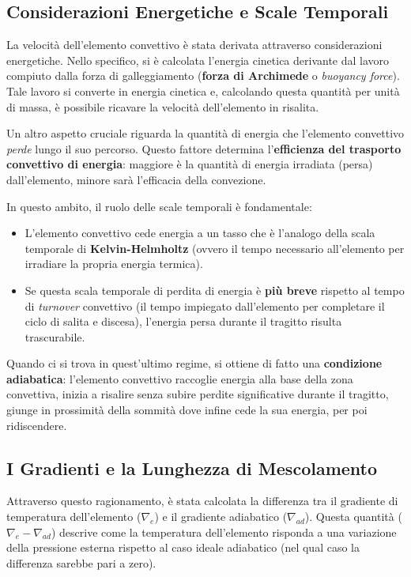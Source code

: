 \subsection{Considerazioni Energetiche e Scale Temporali}

La velocità dell'elemento convettivo è stata derivata attraverso considerazioni energetiche. Nello specifico, si è calcolata l'energia cinetica derivante dal lavoro compiuto dalla forza di galleggiamento (\textbf{forza di Archimede} o \textit{buoyancy force}). Tale lavoro si converte in energia cinetica e, calcolando questa quantità per unità di massa, è possibile ricavare la velocità dell'elemento in risalita.

Un altro aspetto cruciale riguarda la quantità di energia che l'elemento convettivo \textit{perde} lungo il suo percorso. Questo fattore determina l'\textbf{efficienza del trasporto convettivo di energia}: maggiore è la quantità di energia irradiata (persa) dall'elemento, minore sarà l'efficacia della convezione.

In questo ambito, il ruolo delle scale temporali è fondamentale:
\begin{itemize}
\item L'elemento convettivo cede energia a un tasso che è l'analogo della scala temporale di \textbf{Kelvin-Helmholtz} (ovvero il tempo necessario all'elemento per irradiare la propria energia termica).
\item Se questa scala temporale di perdita di energia è \textbf{più breve} rispetto al tempo di \textit{turnover} convettivo (il tempo impiegato dall'elemento per completare il ciclo di salita e discesa), l'energia persa durante il tragitto risulta trascurabile.
\end{itemize}

Quando ci si trova in quest'ultimo regime, si ottiene di fatto una \textbf{condizione adiabatica}: l'elemento convettivo raccoglie energia alla base della zona convettiva, inizia a risalire senza subire perdite significative durante il tragitto, giunge in prossimità della sommità dove infine cede la sua energia, per poi ridiscendere.

\subsection{I Gradienti e la Lunghezza di Mescolamento}

Attraverso questo ragionamento, è stata calcolata la differenza tra il gradiente di temperatura dell'elemento ($\nabla_{e}$) e il gradiente adiabatico ($\nabla_{ad}$). Questa quantità ($\nabla_{e} - \nabla_{ad}$) descrive come la temperatura dell'elemento risponda a una variazione della pressione esterna rispetto al caso ideale adiabatico (nel qual caso la differenza sarebbe pari a zero).

